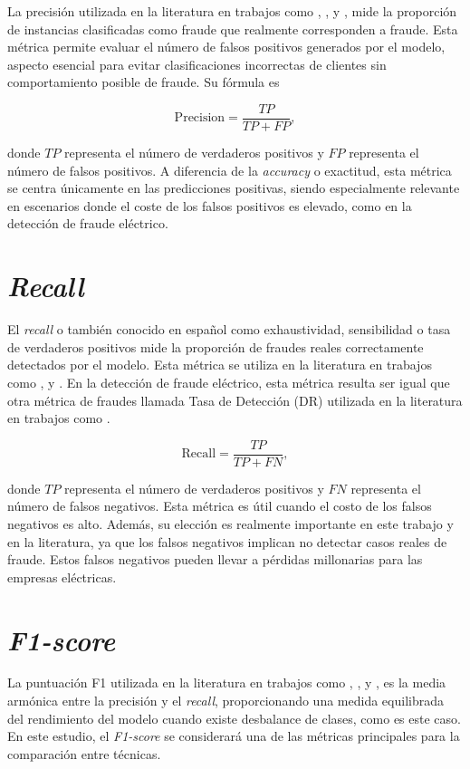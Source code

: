 \documentclass[12pt,a4paper]{report}
\begin{document}
La precisión utilizada en la literatura en trabajos como \cite{articulo1}, \cite{articuloBase}, \cite{articulo2} y \cite{articulo5}, mide la proporción de instancias clasificadas como fraude que realmente corresponden a fraude. Esta métrica permite evaluar el número de falsos positivos generados por el modelo, aspecto esencial para evitar clasificaciones incorrectas de clientes sin comportamiento posible de fraude. Su fórmula es

\[
\text{Precision} = \frac{TP}{TP + FP}
,\]

\noindent donde $TP$ representa el número de verdaderos positivos y $FP$ representa el número de falsos positivos. A diferencia de la \emph{accuracy} o exactitud, esta métrica se centra únicamente en las predicciones positivas, siendo especialmente relevante en escenarios donde el coste de los falsos positivos es elevado, como en la detección de fraude eléctrico.


\section{\emph{Recall}}

El \emph{recall} o también conocido en español como exhaustividad, sensibilidad o tasa de verdaderos positivos mide la proporción de fraudes reales correctamente detectados por el modelo. Esta métrica se utiliza en la literatura en trabajos como \cite{articulo1}, \cite{articulo2} y \cite{articulo5}. En la detección de fraude eléctrico, esta métrica resulta ser igual que otra métrica de fraudes llamada Tasa de Detección (DR) utilizada en la literatura en trabajos como \cite{articuloBase}.

\[
\text{Recall} = \frac{TP}{TP + FN}
,\]

\noindent donde $TP$ representa el número de verdaderos positivos y $FN$ representa el número de falsos negativos. Esta métrica es útil cuando el costo de los falsos negativos es alto. Además, su elección es realmente importante en este trabajo y en la literatura, ya que los falsos negativos implican no detectar casos reales de fraude. Estos falsos negativos pueden llevar a pérdidas millonarias para las empresas eléctricas.


\section{\emph{F1-score}}

La puntuación F1 utilizada en la literatura en trabajos como \cite{articulo1}, \cite{articuloBase}, \cite{articulo2} y \cite{articulo5}, es la media armónica entre la precisión y el \emph{recall}, proporcionando una medida equilibrada del rendimiento del modelo cuando existe desbalance de clases, como es este caso. En este estudio, el \emph{F1-score} se considerará una de las métricas principales para la comparación entre técnicas.
\end{document}
